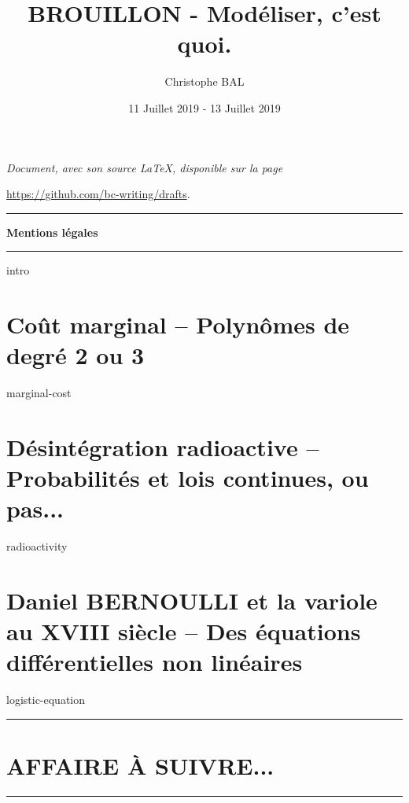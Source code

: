 \documentclass[12pt]{amsart}
\let\oldsection\section
\renewcommand\section[1]{\vfill\pagebreak\oldsection{#1}}
\begin{document}
\title{BROUILLON - Modéliser, c'est quoi.}
\author{Christophe BAL}
\date{11 Juillet 2019 - 13 Juillet 2019}

\maketitle

\begin{center}
	\itshape
	Document, avec son source \LaTeX, disponible sur la page
	
	\url{https://github.com/bc-writing/drafts}.
\end{center}


\bigskip


\begin{center}
	\hrule\vspace{.3em}
	{
		\fontsize{1.35em}{1em}\selectfont
		\textbf{Mentions \og légales \fg}
	}
			
	\vspace{0.45em}
	\doclicenseThis
	\hrule
\end{center}



\setcounter{tocdepth}{2}
\tableofcontents



{intro}





\section{Coût marginal -- Polynômes de degré 2 ou 3}

{marginal-cost}



\section{Désintégration radioactive -- Probabilités et lois continues, ou pas...}

{radioactivity}



\section{Daniel BERNOULLI et la variole au XVIII\ieme{} siècle -- Des équations différentielles non linéaires}

{logistic-equation}



%



\bigskip

\hrule

\oldsection{AFFAIRE À SUIVRE...}

\bigskip

\hrule
\end{document}
